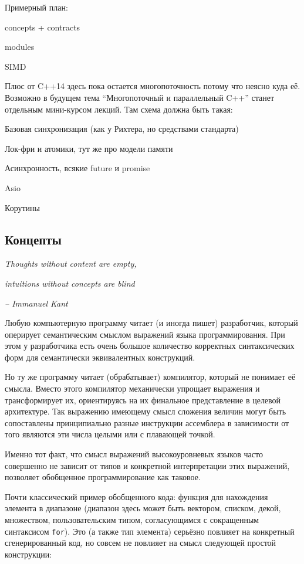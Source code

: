 \documentclass[a4paper,12pt,oneside]{article}
\begin{document}
Примерный план:

concepts + contracts

modules 

SIMD

Плюс от C++14 здесь пока остается многопоточность потому что неясно куда её. Возможно в будущем тема ``Многопоточный и параллельный C++'' станет отдельным мини-курсом лекций. Там схема должна быть такая:

Базовая синхронизация (как у Рихтера, но средствами стандарта)

Лок-фри и атомики, тут же про модели памяти

Асинхронность, всякие future и promise

Asio

Корутины

\pagebreak
\subsection{Концепты}\label{Concepts}

\hfill\textit{Thoughts without content are empty,}

\hfill\textit{intuitions without concepts are blind}{\vspace{0.5em}}

\hfill\textit{-- Immanuel Kant}

Любую компьютерную программу читает (и иногда пишет) разработчик, который оперирует семантическим смыслом выражений языка программирования. При этом у разработчика есть очень большое количество корректных синтаксических форм для семантически эквивалентных конструкций.

Но ту же программу читает (обрабатывает) компилятор, который не понимает её смысла. Вместо этого компилятор механически упрощает выражения и трансформирует их, ориентируясь на их финальное представление в целевой архитектуре. Так выражению имеющему смысл сложения величин могут быть сопоставлены принципиально разные инструкции ассемблера в зависимости от того являются эти числа целыми или с плавающей точкой.

Именно тот факт, что смысл выражений высокоуровневых языков часто совершенно не зависит от типов и конкретной интерпретации этих выражений, позволяет обобщенное программирование как таковое.

Почти классический пример обобщенного кода: функция для нахождения элемента в диапазоне (диапазон здесь может быть вектором, списком, декой, множеством, пользовательским типом, согласующимся с сокращенным синтаксисом \lstinline!for!). Это (а также тип элемента) серьёзно повлияет на конкретный сгенерированный код, но совсем не повлияет на смысл следующей простой конструкции:
\end{document}
